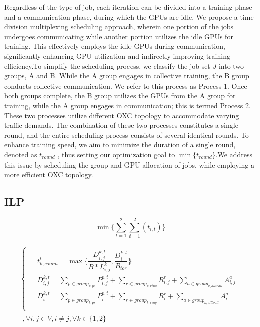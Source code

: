 \documentclass[conference]{IEEEtran}
\begin{document}
Regardless of the type of job, each iteration can be divided into a training phase and a communication phase, during which the GPUs are idle. We propose a time-division multiplexing scheduling approach, wherein one portion of the jobs undergoes communicating while another portion utilizes the idle GPUs for training. This effectively employs the idle GPUs during communication, significantly enhancing GPU utilization and indirectly improving training efficiency.To simplify the scheduling process, we classify the job set $J$ into two groups, A and B. While the A group engages in collective training, the B group conducts collective communication. We refer to this process as Process 1. Once both groups complete, the B group utilizes the GPUs from the A group for training, while the A group engages in communication; this is termed Process 2. These two processes utilize different OXC topology to accommodate varying traffic demands. The combination of these two processes constitutes a single round, and the entire scheduling process consists of several identical rounds. To enhance training speed, we aim to minimize the duration of a single round, denoted as $t_{round}$ , thus setting our optimization goal to $\min\{t_{round}\}$.We address this issue by scheduling the group and GPU allocation of jobs, while employing a more efficient OXC topology.

\subsection{ILP}

\begin{equation}
	\min\{\sum_{t=1}^{2}\sum_{i=1}^{2}(t_{i,t})\}
\end{equation}

\begin{equation}
	\begin{split}
		\begin{cases}
			\begin{aligned}
				& t_{k, comm}^{t} = \max\{\dfrac{D^{k, t}_{i,j}}{B * L^k_{i,j}}, \dfrac{D_i^{k, t}}{B_{tor}}\}\\
				& D^{k, t}_{i,j} = \sum_{p\in group_{k, ps}}P^{p,t}_{i,j} + \sum_{r\in group_{k, ring}}R^{r}_{i,j} + \sum_{a\in group_{k,alltoall}}A^{a}_{i,j}\\
				& D^{k, t}_i = \sum_{p\in group_{k, ps}}P^{p,t}_{i} + \sum_{r\in group_{k, ring}}R^{r}_{i} + \sum_{a\in group_{k,alltoall}}A^{a}_{i}\\
			\end{aligned}
		\end{cases}\\
		\begin{aligned}
			, \forall i, j\in V, i \neq j, \forall k\in \{1,2\}\\
		\end{aligned}
	\end{split}
\end{equation}
\end{document}
